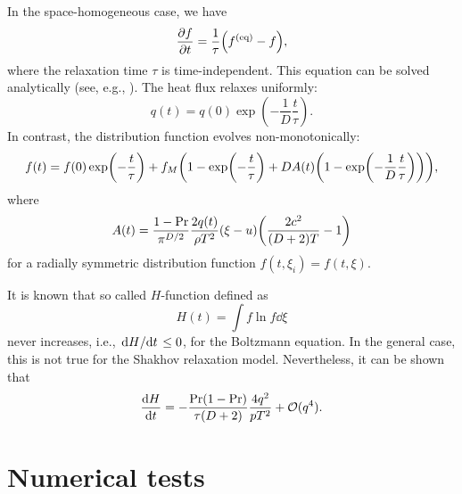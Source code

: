 \documentclass{article}
\newcommand{\equil}[1]{#1^\mathrm{(eq)}}
\begin{document}
In the space-homogeneous case, we have
\begin{equation}\label{eq:relax}
    \pdv{f}{t} = \frac1\tau\qty(\equil{f} - f),
\end{equation}
where the relaxation time $\tau$ is time-independent.
This equation can be solved analytically (see, e.g., \cite{titarev2004numerical}).
The heat flux relaxes uniformly:
\begin{equation}\label{eq:relax:q}
    q(t) = q(0)\exp(-\frac1D\frac{t}\tau).
\end{equation}
In contrast, the distribution function evolves non-monotonically:
\begin{equation}\label{eq:relax:f}
    f(t) = f(0)\exp(-\frac{t}\tau) + f_M\qty(1 - \exp(-\frac{t}\tau) + DA(t)\qty(1-\exp(-\frac1D\frac{t}\tau))),
\end{equation}
where
\begin{equation}\label{eq:relax:A}
    A(t) = \frac{1-\Pr}{\pi^{D/2}}\frac{2q(t)}{\rho T^2}(\xi - u)\qty(\frac{2c^2}{(D+2)T} - 1)
\end{equation}
for a radially symmetric distribution function $f(t,\xi_i) = f(t,\xi)$.

It is known that so called $H$-function defined as
\begin{equation}\label{eq:relax:H}
    H(t) = \int f\ln{f}\dd\xi
\end{equation}
never increases, i.e., $\dv*{H}{t}\leq0$, for the Boltzmann equation.
In the general case, this is not true for the Shakhov relaxation model.
Nevertheless, it can be shown that
\begin{equation}\label{eq:relax:dHdt}
    \dv{H}{t} = -\frac{\Pr(1-\Pr)}{\tau(D+2)}\frac{4q^2}{pT^2} + \mathcal{O}(q^4).
\end{equation}

\section{Numerical tests}
\end{document}
